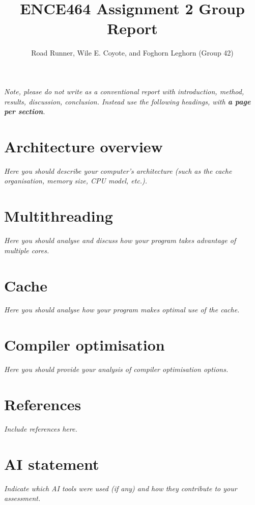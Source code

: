 \documentclass[a4paper,12pt]{article}
\title{ENCE464 Assignment 2 Group Report}
\author{Road Runner, Wile E. Coyote, and Foghorn Leghorn (Group 42)}
\date{}
\newcommand{\comment}[1]{\emph{\color{blue}#1}}
\begin{document}
\maketitle

\comment{Note, please do not write as a conventional report with
  introduction, method, results, discussion, conclusion.  Instead use
  the following headings, with \textbf{a page per section}.}


\section{Architecture overview}

\comment{Here you should describe your computer's architecture (such
  as the cache organisation, memory size, CPU model, etc.).}


\section{Multithreading}

\comment{Here you should analyse and discuss how your program takes
  advantage of multiple cores.}


\section{Cache}

\comment{Here you should analyse how your program makes optimal use
  of the cache.}

\section{Compiler optimisation}

\comment{Here you should provide your analysis of compiler
  optimisation options.}

\section{References}

\comment{Include references here.}

\section{AI statement}

\comment{Indicate which AI tools were used (if any) and how they
  contribute to your assessment.}


\color{blue}
\end{document}
